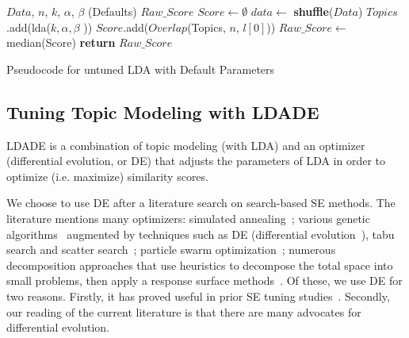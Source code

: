\documentclass[twocolumn,5p,sort&compress]{elsarticle}
\renewcommand{\algorithmicrequire}{\textbf{Input:}}
\renewcommand{\algorithmicensure}{\textbf{Output:}}
\theoremstyle{break}
\begin{document}
\makeatletter
\algrenewcommand\ALG@beginalgorithmic{\footnotesize}
\algrenewcommand{}
\makeatother
\renewcommand{\algorithmicrequire}{\textbf{Input:}}
\renewcommand{\algorithmicensure}{\textbf{Output:}}
\begin{algorithm}
    
    \begin{algorithmic}[1]
    \Require $Data$, $n$, $k$, $\alpha$, $\beta$ (Defaults) 
    \Ensure $Raw\_Score$    
        \State $Score \leftarrow \emptyset$
                \State $data \leftarrow$ \textbf{shuffle}($Data$)
                \State $Topics$.add(lda($k,\alpha,\beta$ ))
            \EndFor
            \State $Score$.add($Overlap$(Topics, $n$, $l[0]$))
        \EndFor
        \State $Raw\_Score \leftarrow $ median(Score)
        \State \textbf{return} $Raw\_Score$
    \EndFunction
    \caption{Pseudocode for untuned LDA with Default Parameters}
    \end{algorithmic}
\end{algorithm}

\subsection{Tuning Topic Modeling with LDADE}
\label{sect:tuning}
LDADE is a combination of topic modeling (with LDA) and an optimizer (differential evolution, or DE) that adjusts
the parameters of LDA in order to optimize (i.e. maximize) similarity scores.

We choose to use DE after a literature search on search-based SE methods.
The literature mentions many optimizers: simulated
annealing~\cite{feather2002converging, menzies2007business}; various genetic
algorithms~\cite{goldberg1979complexity} augmented by techniques such as
DE (differential evolution~\cite{storn1997differential}), tabu search and scatter
search~\cite{glover1986general, beausoleil2006moss, molina2007sspmo,nebro2008abyss}; particle swarm optimization~\cite{pan2008particle}; numerous
decomposition approaches that use heuristics to decompose the total space into
small problems, then apply a response surface methods~\cite{krall2015gale, zuluaga2013active}.
Of these, we use DE for two reasons. Firstly, it has proved useful in prior SE tuning
studies~\cite{wei2006lda}. Secondly,   our reading of the current literature is
that there are many advocates for differential evolution.
\end{document}
